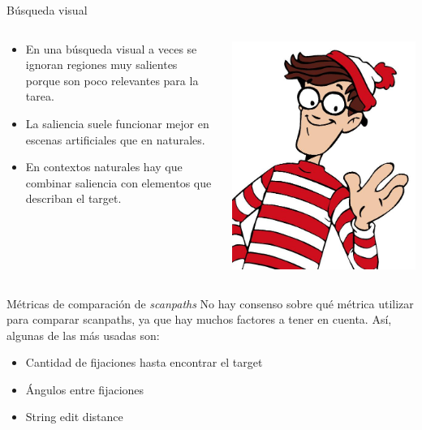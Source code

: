 \documentclass[compress]{beamer}
\begin{document}
\begin{frame}{Búsqueda visual}
  \begin{columns}[T]
    \begin{column}{.6\textwidth}
    \begin{itemize}
    \item En una búsqueda visual a veces se ignoran regiones muy salientes porque son poco relevantes para la tarea.
    \item La saliencia suele funcionar mejor en escenas artificiales que en naturales.
    \item En contextos naturales hay que combinar saliencia con elementos que describan el target.
    \end{itemize}
    \end{column}
    \begin{column}{.4\textwidth}
        \begin{center}
        \includegraphics[width=.8\textwidth]{images/wally.jpg} 
        \end{center}
        \vspace{0.25cm}
    \end{column}
  \end{columns}

\end{frame}

\begin{frame}{Métricas de comparación de \textit{scanpaths}}
No hay consenso sobre qué métrica utilizar para comparar scanpaths, ya que hay muchos factores a tener en cuenta. Así, algunas de las más usadas son:
\begin{itemize}
\item Cantidad de fijaciones hasta encontrar el target
\item Ángulos entre fijaciones
\item String edit distance
\end{itemize}
\end{frame}
\end{document}
